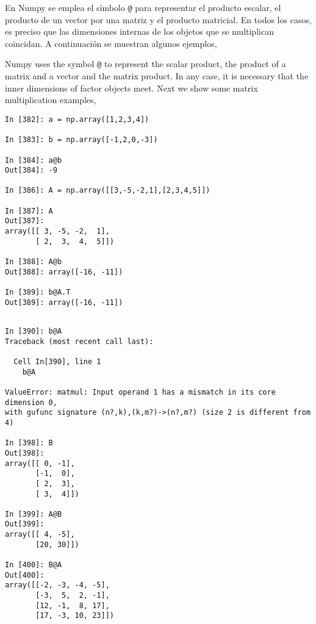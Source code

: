 \begin{paracol}{2}
En Numpy se emplea el símbolo \texttt{@} para representar el producto escalar, el producto de un vector por una matriz y el producto matricial. En todos los casos, es preciso que las dimensiones internas de los objetos que se multiplican coincidan. A continuación se muestran algunos ejemplos,

\switchcolumn
Numpy uses the symbol \texttt{@} to represent the scalar product, the product of a matrix and a vector and the matrix product. In any case, it is necessary that the inner dimensions of factor objects meet. Next we show some matrix multiplication examples, 
\end{paracol}
\begin{center}
    \begin{minipage}{0.7\textwidth}
        \begin{verbatim}
In [382]: a = np.array([1,2,3,4])

In [383]: b = np.array([-1,2,0,-3])

In [384]: a@b
Out[384]: -9

In [386]: A = np.array([[3,-5,-2,1],[2,3,4,5]])

In [387]: A
Out[387]: 
array([[ 3, -5, -2,  1],
       [ 2,  3,  4,  5]])

In [388]: A@b
Out[388]: array([-16, -11])

In [389]: b@A.T
Out[389]: array([-16, -11])

        \end{verbatim}
    \end{minipage}
\end{center}
        
\begin{center}
    \begin{minipage}{0.7\textwidth}
        \begin{verbatim}
        
In [390]: b@A
Traceback (most recent call last):

  Cell In[390], line 1
    b@A

ValueError: matmul: Input operand 1 has a mismatch in its core dimension 0, 
with gufunc signature (n?,k),(k,m?)->(n?,m?) (size 2 is different from 4)

In [398]: B
Out[398]: 
array([[ 0, -1],
       [-1,  0],
       [ 2,  3],
       [ 3,  4]])

In [399]: A@B
Out[399]: 
array([[ 4, -5],
       [20, 30]])

In [400]: B@A
Out[400]: 
array([[-2, -3, -4, -5],
       [-3,  5,  2, -1],
       [12, -1,  8, 17],
       [17, -3, 10, 23]])
        \end{verbatim}
    \end{minipage}
\end{center}

